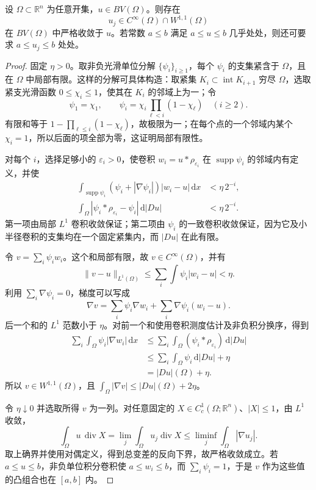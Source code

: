 \begin{theorem}\label{g3:thm:bv-strict-approximation}
	设 \(\Omega\subset\mathbb R^n\) 为任意开集，\(u\in BV(\Omega)\)。则存在
	\[
		u_j\in C^\infty(\Omega)\cap W^{1,1}(\Omega)
	\]
	在 \(BV(\Omega)\) 中严格收敛于 \(u\)。若常数 \(a\le b\) 满足 \(a\le u\le b\) 几乎处处，则还可要求 \(a\le u_j\le b\) 处处。
\end{theorem}
\begin{proof}
	固定 \(\eta>0\)。取非负光滑单位分解 \(\{\psi_i\}_{i\ge1}\)，每个 \(\psi_i\) 的支集紧含于 \(\Omega\)，且在 \(\Omega\) 中局部有限。这样的分解可具体构造：取紧集 \(K_i\subset\operatorname{int}K_{i+1}\) 穷尽 \(\Omega\)，选取紧支光滑函数 \(0\le\chi_i\le1\)，使其在 \(K_i\) 的邻域上为一；令
	\[
		\psi_1=\chi_1,\qquad
		\psi_i=\chi_i\prod_{\ell<i}(1-\chi_\ell)\quad(i\ge2).
	\]
	有限和等于 \(1-\prod_{\ell\le i}(1-\chi_\ell)\)，故极限为一；在每个点的一个邻域内某个 \(\chi_i=1\)，所以后面的项全部为零，这证明局部有限性。

	对每个 \(i\)，选择足够小的 \(\varepsilon_i>0\)，使卷积
	\(w_i=u*\rho_{\varepsilon_i}\) 在 \(\operatorname{supp}\psi_i\) 的邻域内有定义，并使
	\begin{align*}
		\int_{\operatorname{supp}\psi_i}
		(\psi_i+|\nabla\psi_i|)|w_i-u|\,\mathrm dx
		&<\eta\,2^{-i},\\
		\int_\Omega|\psi_i*\rho_{\varepsilon_i}-\psi_i|
		\,\mathrm d|Du|&<\eta\,2^{-i}.
	\end{align*}
	第一项由局部 \(L^1\) 卷积收敛保证；第二项由 \(\psi_i\) 的一致卷积收敛保证，因为它及小半径卷积的支集均在一个固定紧集内，而 \(|Du|\) 在此有限。

	令 \(v=\sum_i\psi_iw_i\)。这个和局部有限，故 \(v\in C^\infty(\Omega)\)，并有
	\[
		\|v-u\|_{L^1(\Omega)}
		\le\sum_i\int\psi_i|w_i-u|<\eta.
	\]
	利用 \(\sum_i\nabla\psi_i=0\)，梯度可以写成
	\[
		\nabla v=\sum_i\psi_i\nabla w_i
		+\sum_i\nabla\psi_i(w_i-u).
	\]
	后一个和的 \(L^1\) 范数小于 \(\eta\)。对前一个和使用卷积测度估计及非负积分换序，得到
	\begin{align*}
		\sum_i\int_\Omega\psi_i|\nabla w_i|\,\mathrm dx
		&\le\sum_i\int_\Omega
		(\psi_i*\rho_{\varepsilon_i})\,\mathrm d|Du|\\
		&\le\sum_i\int_\Omega\psi_i\,\mathrm d|Du|+\eta\\
		&=|Du|(\Omega)+\eta.
	\end{align*}
	所以 \(v\in W^{1,1}(\Omega)\)，且
	\(\int_\Omega|\nabla v|\le|Du|(\Omega)+2\eta\)。

	令 \(\eta\downarrow0\) 并选取所得 \(v\) 为一列。对任意固定的 \(X\in C_c^1(\Omega;\mathbb R^n)\)、\(|X|\le1\)，由 \(L^1\) 收敛，
	\[
		\int_\Omega u\,\operatorname{div}X
		=\lim_j\int_\Omega u_j\operatorname{div}X
		\le\liminf_j\int_\Omega|\nabla u_j|.
	\]
	取上确界并使用对偶定义，得到总变差的反向下界，故严格收敛成立。若 \(a\le u\le b\)，非负单位积分卷积使 \(a\le w_i\le b\)，而 \(\sum_i\psi_i=1\)，于是 \(v\) 作为这些值的凸组合也在 \([a,b]\) 内。
\end{proof}

